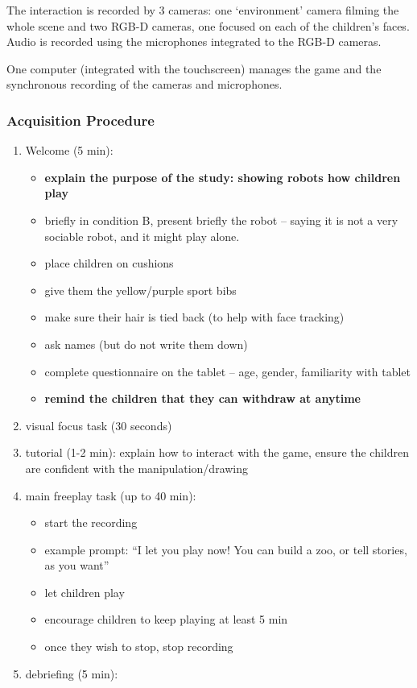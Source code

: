 \documentclass{article}
\begin{document}
The interaction is recorded by 3 cameras: one `environment' camera
filming the whole scene and two RGB-D cameras, one focused on each of the
children's faces. Audio is recorded using the microphones integrated to the RGB-D cameras. 

One computer (integrated with the touchscreen) manages the game and the
synchronous recording of the cameras and microphones.

\subsubsection{Acquisition Procedure}


\begin{enumerate}
\def\labelenumi{\arabic{enumi}.}
\item
  Welcome (5 min):

  \begin{itemize}
  \item
    \textbf{explain the purpose of the study: showing robots how
    children play}
    \item
    briefly 
    in condition B, present briefly the robot -- saying it is not a very
    sociable robot, and it might play alone.
  \item
    place children on cushions
  \item
    give them the yellow/purple sport bibs
  \item
    make sure their hair is tied back (to help with face tracking)
  \item
    ask names (but do not write them down)
  \item
     complete questionnaire on the tablet -- age, gender, familiarity with
    tablet
  \item
    \textbf{remind the children that they can withdraw at anytime}
  

  \end{itemize}
\item
  visual focus task (30 seconds)
\item
  tutorial (1-2 min): explain how to interact with the game, ensure the
  children are confident with the manipulation/drawing
\item
  main freeplay task (up to 40 min):

  \begin{itemize}
  \item
    start the recording
  \item
    example prompt: ``I let you play now! You can build a zoo, or tell
    stories, as you want''
  \item
    let children play
  \item
    encourage children to keep playing at least 5 min
  \item
    once they wish to stop, stop recording
  \end{itemize}
\item
  debriefing (5 min):


\end{enumerate}
\end{document}
